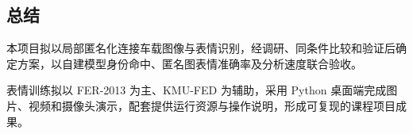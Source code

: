 \begin{samepage}
\section{总结}
\label{sec:conclusion}
本项目拟以局部匿名化连接车载图像与表情识别，经调研、同条件比较和验证后确定方案，以自建模型身份命中、匿名图表情准确率及分析速度联合验收。

表情训练拟以 FER-2013 为主、KMU-FED 为辅助，采用 Python 桌面端完成图片、视频和摄像头演示，配套提供运行资源与操作说明，形成可复现的课程项目成果。

\end{samepage}
